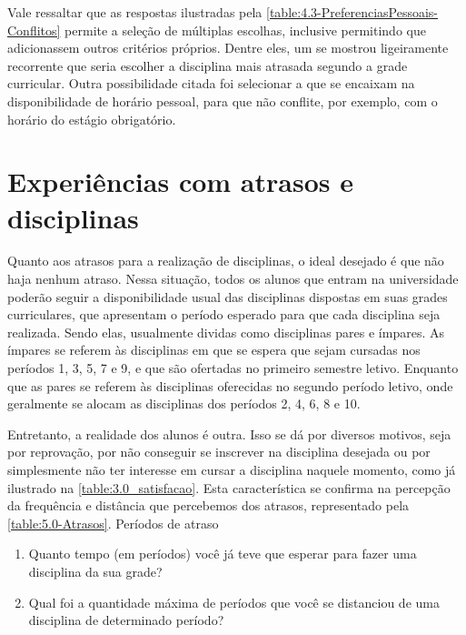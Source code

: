 \begin{apendicesenv}
  Vale ressaltar que as respostas ilustradas pela \autoref{table:4.3-PreferenciasPessoais-Conflitos} permite a seleção de múltiplas escolhas, inclusive permitindo que adicionassem outros critérios próprios. Dentre eles, um se mostrou ligeiramente recorrente que seria escolher a disciplina mais atrasada segundo a grade curricular. Outra possibilidade citada foi selecionar a que se encaixam na disponibilidade de horário pessoal, para que não conflite, por exemplo, com o horário do estágio obrigatório.

  \section*{Experiências com atrasos e disciplinas} \label{sec:Experiências com atrasos e disciplinas}

  Quanto aos atrasos para a realização de disciplinas, o ideal desejado é que não haja nenhum atraso. Nessa situação, todos os alunos que entram na universidade poderão seguir a disponibilidade usual das disciplinas dispostas em suas grades curriculares, que apresentam o período esperado para que cada disciplina seja realizada. Sendo elas, usualmente dividas como disciplinas pares e ímpares. As ímpares se referem às disciplinas em que se espera que sejam cursadas nos períodos 1, 3, 5, 7 e 9, e que são ofertadas no primeiro semestre letivo. Enquanto que as pares se referem às disciplinas oferecidas no segundo período letivo, onde geralmente se alocam as disciplinas dos períodos 2, 4, 6, 8 e 10.

  Entretanto, a realidade dos alunos é outra. Isso se dá por diversos motivos, seja por reprovação, por não conseguir se inscrever na disciplina desejada ou por simplesmente não ter interesse em cursar a disciplina naquele momento, como já ilustrado na \autoref{table:3.0_satisfacao}. Esta característica se confirma na percepção da frequência e distância que percebemos dos atrasos, representado pela \autoref{table:5.0-Atrasos}.
  Períodos de atraso

  \begin{enumerate}
    \item Quanto tempo (em períodos) você já teve que esperar para fazer uma disciplina da sua grade?
    \item Qual foi a quantidade máxima de períodos que você se distanciou de uma disciplina de determinado período?
  \end{enumerate}


\end{apendicesenv}
